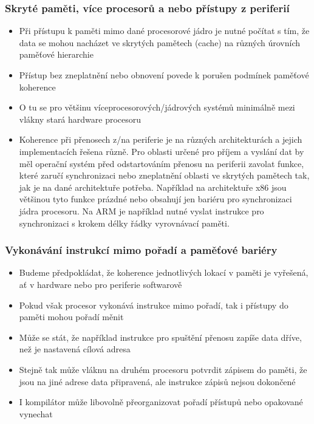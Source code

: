 \documentclass{beamer}
\begin{document}
\begin{frame}
\frametitle{Skryté paměti, více procesorů a nebo přístupy z periferií}

\begin{itemize}
 \item Při přístupu k paměti mimo dané procesorové jádro je nutné počítat s tím, že data se mohou
       nacházet ve skrytých pamětech (cache) na různých úrovních paměťové hierarchie
 \item Přístup bez zneplatnění nebo obnovení povede k porušen podmínek paměťové koherence
 \item O tu se pro většinu víceprocesorových/jádrových systémů minimálně mezi vlákny
       stará hardware procesoru
 \item Koherence při přenosech z/na periferie je na různých architekturách a jejich implementacích
       řešena různě. Pro oblasti určené pro příjem a vyslání dat by měl operační systém
       před odstartováním přenosu na periferii zavolat funkce, které zaručí synchronizaci
       nebo zneplatnění oblasti ve skrytých pamětech tak, jak je na dané architektuře potřeba.
       Například na architektuře x86 jsou většinou tyto funkce prázdné nebo obsahují
       jen bariéru pro synchronizaci jádra procesoru. Na ARM je například nutné vyslat
       instrukce pro synchronizaci s krokem délky řádky vyrovnávací paměti.

\end{itemize}
\end{frame}

\begin{frame}[fragile]
\frametitle{Vykonávání instrukcí mimo pořadí a paměťové bariéry}

\begin{itemize}
 \item Budeme předpokládat, že koherence jednotlivých lokací v paměti je vyřešená, ať v hardware nebo pro periferie softwarově
 \item Pokud však procesor vykonává instrukce mimo pořadí, tak i přístupy do paměti mohou pořadí měnit
 \item Může se stát, že například instrukce pro spuštění přenosu zapíše data dříve, než je nastavená cílová adresa
 \item Stejně tak může vláknu na druhém procesoru potvrdit zápisem do paměti, že jsou na jiné adrese data připravená,
       ale instrukce zápisů nejsou dokončené
 \item I kompilátor může libovolně přeorganizovat pořadí přístupů nebo opakované vynechat
\end{itemize}

\end{frame}
\end{document}

